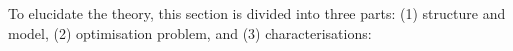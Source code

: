 To elucidate the theory, this section is divided into three parts: (1) structure and model, (2) optimisation problem, and (3) characterisations:






